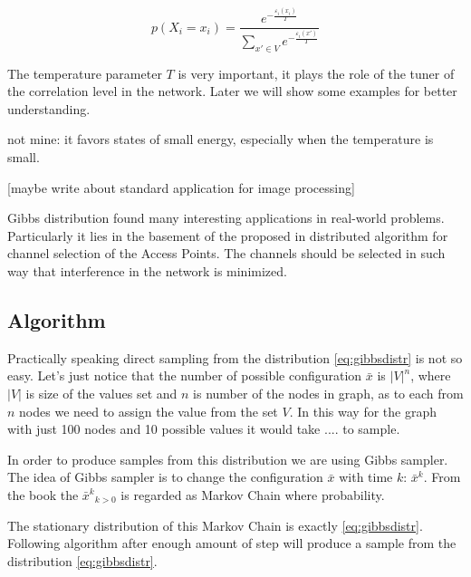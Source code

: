 \documentclass[12pt]{report}
\begin{document}
$$ p(X_i = x_i) = \frac{ e^{-\frac{\varepsilon_i(x_i)}{T}} }{ \sum\limits_{x'\in V} e^{-\frac{\varepsilon_i(x')}{T}}} $$

The temperature parameter $T$ is very important, it plays the role of the tuner of the correlation level in the network. Later we will show some examples for better understanding. 

not mine: it favors states of small energy, especially when the temperature is small.

[maybe write about standard application for image processing]

Gibbs distribution found many interesting applications in real-world problems. Particularly it lies in the basement of the proposed in \cite{kauffmann2007measurement} distributed algorithm for channel selection of the Access Points. The channels should be selected in such way that interference in the network is minimized. 

\subsection{Algorithm} 

Practically speaking direct sampling from the distribution \ref{eq:gibbsdistr} is not so easy. Let's just notice that the number of possible configuration $\bar{x}$ is $|V|^n$, where $|V|$ is size of the values set and $n$ is number of the nodes in graph, as to each from $n$ nodes we need to assign the value from the set $V$. 
In this way for the graph with just 100 nodes and 10 possible values it would take .... to sample.  

In order to produce samples from this distribution we are using Gibbs sampler. The idea of Gibbs sampler is to change the configuration $\bar{x}$ with time $k$: $ \bar{x}^k $.
From the book \cite{bremaud2013markov} the $ {\bar{x}^k}_{k > 0}$ is regarded as Markov Chain where
probability.

The stationary distribution of this Markov Chain is exactly \ref{eq:gibbsdistr}.
Following algorithm after enough amount of step will produce a sample from the distribution \ref{eq:gibbsdistr}.
\end{document}
